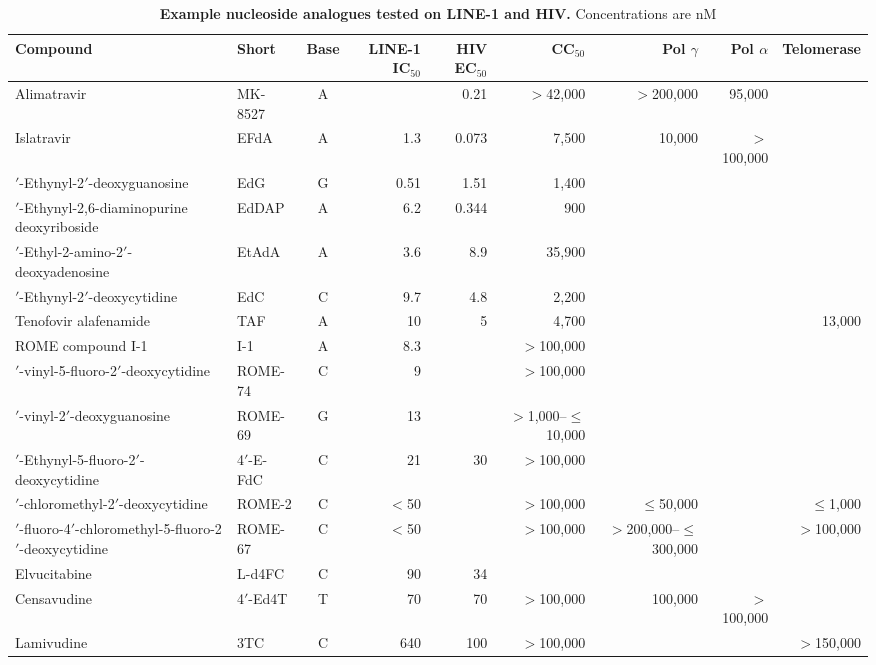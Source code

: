 \documentclass[11pt,twocolumn,twoside]{extarticle}
\begin{document}
\begin{table}[!t]
\caption{\textbf{Example nucleoside analogues tested on LINE-1 and HIV.}
Concentrations are nM}
\label{tab:nucleosides}
\vspace{0.25em}
\scriptsize
\setlength{\tabcolsep}{3.2pt}
\renewcommand{\arraystretch}{1.08}
\centering
\begin{tabular}{@{}>{\raggedright\arraybackslash}p{6.05cm} l c r r r r r r@{}}
\toprule
\textbf{Compound} & \textbf{Short} & \textbf{Base} & \textbf{LINE-1 IC$_{50}$} & \textbf{HIV EC$_{50}$} & \textbf{CC$_{50}$} & \textbf{Pol $\gamma$} & \textbf{Pol $\alpha$} & \textbf{Telomerase} \\
\midrule
Alimatravir & MK-8527 & A &  & 0.21 & $>$42,000 & $>$200,000 & 95,000 &  \\
Islatravir & EFdA & A & 1.3 & 0.073 & 7,500 & 10,000 & $>$100,000 &  \\
4$'$-Ethynyl-2$'$-deoxyguanosine & EdG & G & 0.51 & 1.51 & 1,400 &  &  &  \\
4$'$-Ethynyl-2,6-diaminopurine deoxyriboside & EdDAP & A & 6.2 & 0.344 & 900 &  &  &  \\
4$'$-Ethyl-2-amino-2$'$-deoxyadenosine & EtAdA & A & 3.6 & 8.9 & 35,900 &  &  &  \\
4$'$-Ethynyl-2$'$-deoxycytidine & EdC & C & 9.7 & 4.8 & 2,200 &  &  &  \\
Tenofovir alafenamide & TAF & A & 10 & 5 & 4,700 &  &  & 13,000 \\
ROME compound I-1 & I-1 & A & 8.3 &  & $>$100,000 &  &  &  \\
4$'$-vinyl-5-fluoro-2$'$-deoxycytidine & ROME-74 & C & 9 &  & $>$100,000 &  &  &  \\
4$'$-vinyl-2$'$-deoxyguanosine & ROME-69 & G & 13 &  & $>$1,000--$\leq$10,000 &  &  &  \\
4$'$-Ethynyl-5-fluoro-2$'$-deoxycytidine & 4$'$-E-FdC & C & 21 & 30 & $>$100,000 &  &  &  \\
4$'$-chloromethyl-2$'$-deoxycytidine & ROME-2 & C & $<$50 &  & $>$100,000 & $\leq$50,000 &  & $\leq$1,000 \\
2$'$-fluoro-4$'$-chloromethyl-5-fluoro-2$'$-deoxycytidine & ROME-67 & C & $<$50 &  & $>$100,000 & $>$200,000--$\leq$300,000 &  & $>$100,000 \\
Elvucitabine & L-d4FC & C & 90 & 34 &  &  &  &  \\
Censavudine & 4$'$-Ed4T & T & 70 & 70 & $>$100,000 & 100,000 & $>$100,000 &  \\
Lamivudine & 3TC & C & 640 & 100 & $>$100,000 &  &  & $>$150,000 \\

\end{tabular}
\end{table}
\end{document}
